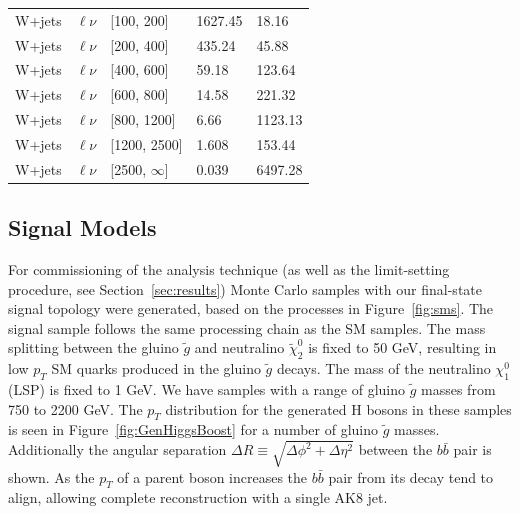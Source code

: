 \begin{table}[hbp!]
\begin{tabular}{cclll}
W+jets & $\ell\nu$ & [100, 200] & 1627.45 & 18.16\\
W+jets & $\ell{\nu}$ & [200, 400] & 435.24 & 45.88\\
W+jets & $\ell{\nu}$ & [400, 600] & 59.18 & 123.64\\
W+jets & $\ell{\nu}$ & [600, 800] & 14.58 & 221.32\\
W+jets & $\ell{\nu}$ & [800, 1200] & 6.66 & 1123.13\\
W+jets & $\ell{\nu}$ & [1200, 2500] & 1.608 & 153.44\\
W+jets & $\ell{\nu}$ & [2500, $\infty$] & 0.039 & 6497.28\\
\hline \hline
\end{tabular}
\end{table}

\subsection{Signal Models}
\label{sec:signal-models}

For commissioning of the analysis technique (as well as the limit-setting procedure, see Section~\ref{sec:results}) Monte Carlo samples with our final-state signal topology were generated, based on the processes in Figure~\ref{fig:sms}. The signal sample follows the same processing chain as the SM samples. The mass splitting between the gluino $\tilde{g}$ and neutralino $\tilde{\chi}_{2}^{0}$ is fixed to 50 GeV, resulting in low $p_{T}$ SM quarks produced in the gluino $\tilde{g}$ decays. The mass of the neutralino $\chi^{0}_{1}$ (LSP) is fixed to 1 GeV. We have samples with a range of gluino $\tilde{g}$ masses from 750 to 2200 GeV. The $p_{T}$ distribution for the generated H bosons in these samples is seen in Figure~\ref{fig:GenHiggsBoost} for a number of gluino $\tilde{g}$ masses. Additionally the angular separation $\Delta R \equiv \sqrt{\Delta\phi^{2}+\Delta\eta^{2}}$ between the $b\bar{b}$ pair is shown. As the $p_{T}$ of a parent boson increases the $b\bar{b}$ pair from its decay tend to align, allowing complete reconstruction with a single AK8 jet.

